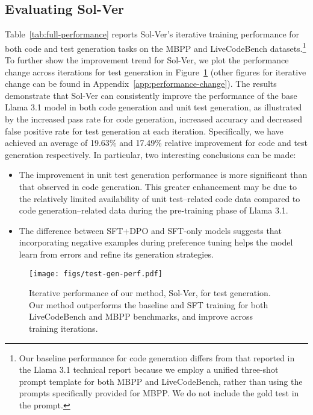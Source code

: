 \subsection{Evaluating {\sc Sol-Ver}}
Table~\ref{tab:full-performance} reports  {\sc Sol-Ver}'s iterative training performance for both code and test generation tasks on the MBPP and LiveCodeBench datasets.\footnote{Our baseline performance for code generation differs from that reported in the Llama 3.1 technical report because we employ a unified three-shot prompt template for both MBPP and LiveCodeBench, rather than using the prompts specifically provided for MBPP. We do not include the gold test in the prompt.}
To further show the improvement trend for {\sc Sol-Ver}, we plot the performance change across iterations for test generation in Figure~\ref{fig:test-gen-perf} (other figures for iterative change can be found in Appendix~\ref{app:performance-change}).
The results demonstrate that {\sc Sol-Ver} can consistently improve the performance of the base Llama 3.1 model in both code generation and unit test generation, as illustrated by the increased pass rate for code generation, increased accuracy and decreased false positive rate for test generation at each iteration. Specifically, we have achieved an average of 19.63\% and 17.49\% relative improvement for code and test generation respectively. In particular, two interesting conclusions can be made:
\begin{itemize}[nosep, leftmargin=*]
    \item The improvement in unit test generation performance is more significant than that observed in code generation. This greater enhancement may be due to the relatively limited availability of unit test–related code data compared to code generation–related data during the pre-training phase of Llama 3.1.
    \item The difference between SFT+DPO and SFT-only models suggests that incorporating negative examples during preference tuning helps the model learn from errors and refine its generation strategies.
\end{itemize}

\begin{figure}
    \centering
    \texttt{[image: figs/test-gen-perf.pdf]}
    \vspace{-0.5em}
    \caption{Iterative performance of our method, {\sc Sol-Ver}, for test generation. Our method outperforms the baseline and SFT training for both LiveCodeBench and MBPP benchmarks, and improve across training iterations.  }
    \label{fig:test-gen-perf}
\end{figure}


